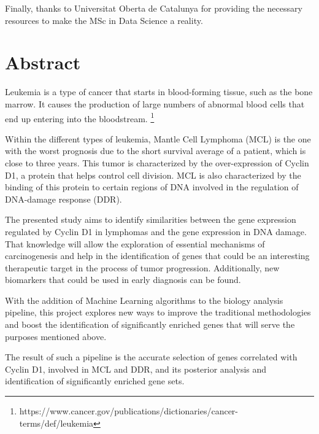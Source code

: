 Finally, thanks to Universitat Oberta de Catalunya for providing the necessary resources to make the MSc in Data Science a reality.

\chapter*{Abstract}

\onehalfspacing

Leukemia is a type of cancer that starts in blood-forming tissue, such as the bone marrow. It causes the production of large numbers of abnormal blood cells that end up entering into the bloodstream. \footnote{https://www.cancer.gov/publications/dictionaries/cancer-terms/def/leukemia}

Within the different types of leukemia, Mantle Cell Lymphoma (MCL) is the one with the worst prognosis due to the short survival average of a patient, which is close to three years.
This tumor is characterized by the over-expression of Cyclin D1, a protein that helps control cell division. MCL is also characterized by the binding of this protein to certain regions of DNA involved in the regulation of DNA-damage response (DDR).


The presented study aims to identify similarities between the gene expression regulated by Cyclin D1 in lymphomas and the gene expression in DNA damage.
That knowledge will allow the exploration of essential mechanisms of carcinogenesis and help in the identification of genes that could be an interesting therapeutic target in the process of tumor progression. Additionally, new biomarkers that could be used in early diagnosis can be found.

With the addition of Machine Learning algorithms to the biology analysis pipeline, this project explores new ways to improve the traditional methodologies and boost the identification of significantly enriched genes that will serve the purposes mentioned above.

The result of such a pipeline is the accurate selection of genes correlated with Cyclin D1, involved in MCL and DDR, and its posterior analysis and identification of significantly enriched gene sets.

